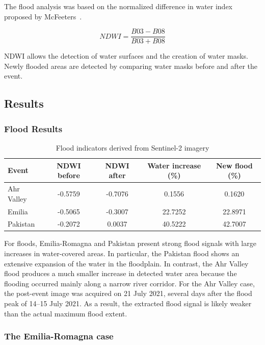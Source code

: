 \documentclass[12pt]{article}
\begin{document}
The flood analysis was based on the normalized difference in water index proposed by McFeeters~\cite{mcfeeters1996}.

\begin{equation}
NDWI = \frac{B03 - B08}{B03 + B08}
\end{equation}

NDWI allows the detection of water surfaces and the creation of water masks. Newly flooded areas are detected by comparing water masks before and after the event.

\subsection{Results}

\subsubsection{Flood Results}

\begin{table}[H]
\centering
\begin{tabular}{lcccc}
\toprule
Event & NDWI before & NDWI after & Water increase (\%) & New flood (\%) \\
\midrule
Ahr Valley & -0.5759 & -0.7076 & 0.1556 & 0.1620 \\
Emilia & -0.5065 & -0.3007 & 22.7252 & 22.8971 \\
Pakistan & -0.2072 & 0.0037 & 40.5222 & 42.7007 \\
\bottomrule
\end{tabular}
\caption{Flood indicators derived from Sentinel-2 imagery}
\end{table}

For floods, Emilia-Romagna and Pakistan present strong flood signals with large increases in water-covered areas. In particular, the Pakistan flood shows an extensive expansion of the water in the floodplain. In contrast, the Ahr Valley flood produces a much smaller increase in detected water area because the flooding occurred mainly along a narrow river corridor. For the Ahr Valley case, the post-event image was acquired on 21 July 2021, several days after the flood peak of 14--15 July 2021. As a result, the extracted flood signal is likely weaker than the actual maximum flood extent. 

\subsubsection{The Emilia-Romagna case}
\end{document}
